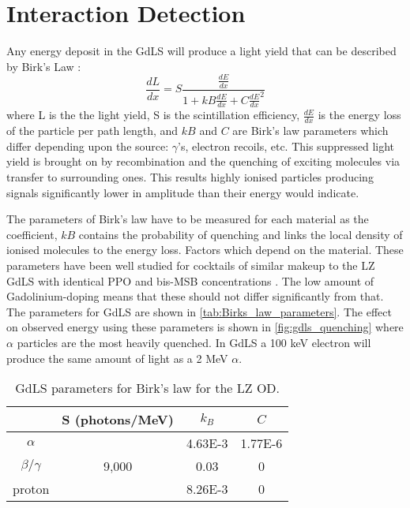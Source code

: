 \section{Interaction Detection}
\label{sec:od_physics}
\par
Any energy deposit in the GdLS will produce a light yield that can be described by Birk's Law \cite{birks_law_ref}:
\begin{equation} 
    \frac{dL}{dx} = S \frac{\frac{dE}{dx}}{1 + kB\frac{dE}{dx} + C\frac{dE}{dx}^2}
    \label{eq:birkslaw}
\end{equation}
where L is the the light yield, S is the scintillation efficiency, $\frac{dE}{dx}$ is the energy loss of the particle per path length, and $kB$ and $C$ are Birk's law parameters which differ depending upon the source: $\gamma$'s, electron recoils, etc.
This suppressed light yield is brought on by recombination and the quenching of exciting molecules via transfer to surrounding ones.
This results highly ionised particles producing signals significantly lower in amplitude than their energy would indicate.
\par
The parameters of Birk's law have to be measured for each material as the coefficient, $kB$ contains the probability of quenching and links the local density of ionised molecules to the energy loss.
Factors which depend on the material.
These parameters have been well studied for cocktails of similar makeup to the LZ GdLS with identical PPO and bis-MSB concentrations \cite{ls_alpha_quenching_ref,ls_proton_quenching_ref}.
The low amount of Gadolinium-doping means that these should not differ significantly from that.
The parameters for GdLS are shown in \autoref{tab:Birks_law_parameters}.
The effect on observed energy using these parameters is shown in \autoref{fig:gdls_quenching} where $\alpha$ particles are the most heavily quenched.
In GdLS a 100 keV electron will produce the same amount of light as a 2 MeV $\alpha$.
\begin{table}[!htbp]
    \centering
    \begin{tabular}{c | c | c | c }
                   & S (photons/MeV) & $k_{B}$ & $C$ \\ \hline
    $\alpha$       &                 & 4.63E-3 & 1.77E-6 \\
    $\beta/\gamma$ & 9,000           & 0.03    & 0 \\ 
    proton         &                 & 8.26E-3 & 0
    \end{tabular}
    \caption{GdLS parameters for Birk's law for the LZ OD.}
    \label{tab:Birks_law_parameters}
\end{table} 

